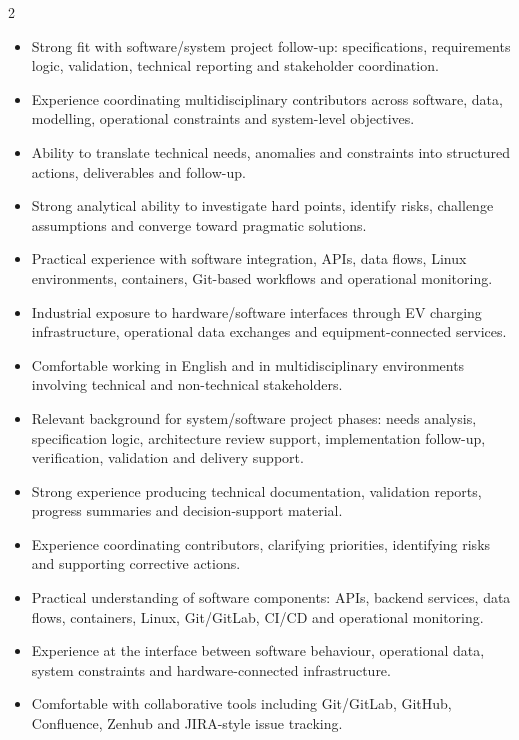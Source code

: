 \documentclass[8pt,a4paper,ragged2e,withhyper]{altacv}
\begin{document}
\begin{paracol}{2}
\begin{itemize}
  \item Strong fit with software/system project follow-up: specifications, requirements logic, validation, technical reporting and stakeholder coordination.
  \item Experience coordinating multidisciplinary contributors across software, data, modelling, operational constraints and system-level objectives.
  \item Ability to translate technical needs, anomalies and constraints into structured actions, deliverables and follow-up.
  \item Strong analytical ability to investigate hard points, identify risks, challenge assumptions and converge toward pragmatic solutions.
  \item Practical experience with software integration, APIs, data flows, Linux environments, containers, Git-based workflows and operational monitoring.
  \item Industrial exposure to hardware/software interfaces through EV charging infrastructure, operational data exchanges and equipment-connected services.
  \item Comfortable working in English and in multidisciplinary environments involving technical and non-technical stakeholders.
\end{itemize}


\begin{itemize}
  \item Relevant background for system/software project phases: needs analysis, specification logic, architecture review support, implementation follow-up, verification, validation and delivery support.
  \item Strong experience producing technical documentation, validation reports, progress summaries and decision-support material.
  \item Experience coordinating contributors, clarifying priorities, identifying risks and supporting corrective actions.
  \item Practical understanding of software components: APIs, backend services, data flows, containers, Linux, Git/GitLab, CI/CD and operational monitoring.
  \item Experience at the interface between software behaviour, operational data, system constraints and hardware-connected infrastructure.
  \item Comfortable with collaborative tools including Git/GitLab, GitHub, Confluence, Zenhub and JIRA-style issue tracking.
\end{itemize}


\end{paracol}
\end{document}
